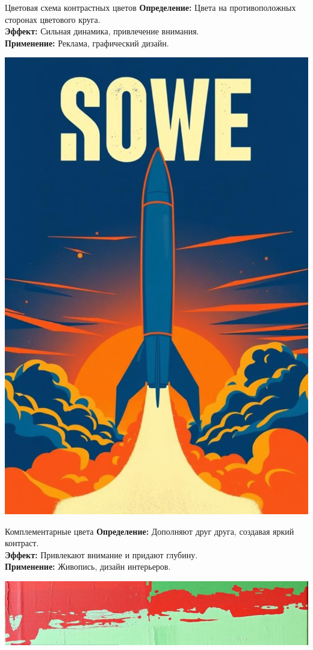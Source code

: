\documentclass{beamer}
\begin{document}
\begin{frame}{Цветовая схема контрастных цветов}
    \textbf{Определение:} Цвета на противоположных сторонах цветового круга. \\
    \vspace{0.3cm}
    \textbf{Эффект:} Сильная динамика, привлечение внимания. \\
    \vspace{0.3cm}
    \textbf{Применение:} Реклама, графический дизайн.
    \begin{center}
        \includegraphics[width=0.6\linewidth]{contrast_example.png} %
    \end{center}
\end{frame}

\begin{frame}{Комплементарные цвета}
    \textbf{Определение:} Дополняют друг друга, создавая яркий контраст. \\
    \vspace{0.3cm}
    \textbf{Эффект:} Привлекают внимание и придают глубину. \\
    \vspace{0.3cm}
    \textbf{Применение:} Живопись, дизайн интерьеров.
    \begin{center}
        \includegraphics[width=0.6\linewidth]{complementary_example.png} %
    \end{center}
\end{frame}
\end{document}
